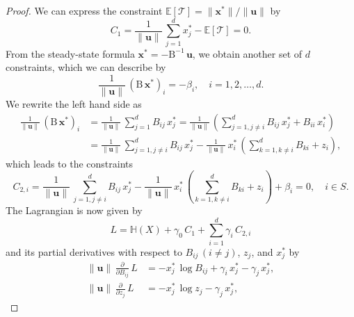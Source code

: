 \documentclass[smallextended]{svjour3}
\renewcommand{\tens}[1]{\mathrm{#1}}
\renewcommand{\vec}[1]{\mathbf{#1}}
\newcommand{\E}{\mathbb{E}}
\newcommand{\TT}{\mathcal{T}}
\renewcommand{\H}{\mathbb{H}}
\newcommand{\suml}{\sum\limits}
\newcommand{\pderiv}[1]{\frac{\partial}{\partial #1}}
\newcommand{\vnorms}[1]{\|#1\|}
\begin{document}
	\begin{proof}%
		We can express the constraint $\E\left[\TT\right] =\vnorms{\vec{x}^\ast}/\vnorms{\vec{u}}$ by
		\begin{equation}
		C_1 = \frac{1}{\vnorms{\vec{u}}}\,\suml_{j=1}^d x_j^\ast - \E\left[\TT\right] = 0.
		\end{equation}
		From the steady-state formula $\vec{x}^\ast = -\tens{B}^{-1}\,\vec{u}$, we obtain another set of $d$ constraints, which we can describe by
		\begin{equation}
			\frac{1}{\vnorms{\vec{u}}}\,(\tens{B}\,\vec{x}^\ast)_i=-\beta_i,\quad i=1,2,\ldots,d.
		\end{equation}
		We rewrite the left hand side as
		\begin{equation}
      \begin{aligned}
        \frac{1}{\vnorms{\vec{u}}}\,(\tens{B}\,\vec{x}^\ast)_i &= \frac{1}{\vnorms{\vec{u}}}\,\suml_{j=1}^d B_{ij}\,x_j^\ast = \frac{1}{\vnorms{\vec{u}}}\,\left(\suml_{j=1,j\neq i}^d B_{ij}\,x_j^\ast + B_{ii}\,x_i^\ast\right)\\
        &= \frac{1}{\vnorms{\vec{u}}}\,\suml_{j=1,j\neq i}^d B_{ij}\,x_j^\ast-\frac{1}{\vnorms{\vec{u}}}\,x_i^\ast\,\left(\suml_{k=1,k\neq i}^d B_{ki} + z_i\right), 
      \end{aligned}
    \end{equation}
		which leads to the constraints
		\begin{equation}\label{eqn:constraint_C2}
			C_{2,i} = \frac{1}{\vnorms{\vec{u}}}\,\suml_{j=1,j\neq i}^d B_{ij}\,x_j^\ast-\frac{1}{\vnorms{\vec{u}}}\,x_i^\ast\,\left(\suml_{k=1,k\neq i}^d B_{ki} + z_i\right) + \beta_i = 0,\quad i\in S.
		\end{equation}	
		The Lagrangian is now given by
		\begin{equation}\label{eqn:Lagrangian}
			L = \H(X) + \gamma_0\,C_1 + \suml_{i=1}^d \gamma_i\,C_{2,i}
		\end{equation}
		and its partial derivatives with respect to $B_{ij}\,(i\neq j)$, $z_j$, and $ x_j^\ast$ by
    \begin{equation}
      \begin{aligned}
        \vnorms{\vec{u}}\,\pderiv{B_{ij}}\,L &=  -x_j^\ast\,\log B_{ij} +   \gamma_i\,x_j^\ast- \gamma_j\,x_j^\ast,\\
        \vnorms{\vec{u}}\,\pderiv{z_j}\,L &= -x_j^\ast\,\log z_j-\gamma_j\,x_j^\ast,
      \end{aligned}
    \end{equation}

\end{proof}
\end{document}
